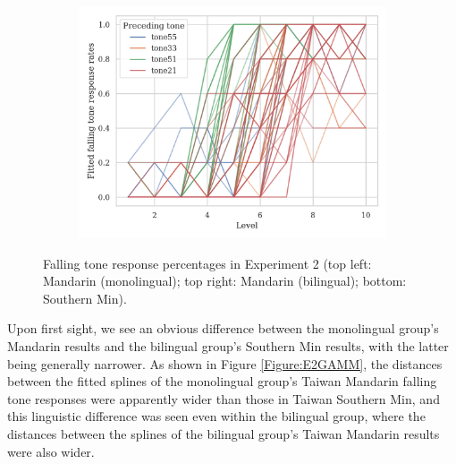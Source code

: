 \begin{figure}[hbt!]
\begin{subfigure}[b]{.45\textwidth}
\includegraphics[width=\textwidth]{figures/E2/Min_E2_raw.png}
\end{subfigure}
\caption{Falling tone response percentages in Experiment 2 (top left: Mandarin (monolingual); top right: Mandarin (bilingual); bottom: Southern Min).}
\label{Figure:E2Raw}
\end{figure}

Upon first sight, we see an obvious difference between the monolingual group's Mandarin results and the bilingual group's Southern Min results, with the latter being generally narrower. As shown in Figure \ref{Figure:E2GAMM}, the distances between the fitted splines of the monolingual group's Taiwan Mandarin falling tone responses were apparently wider than those in Taiwan Southern Min, and this linguistic difference was seen even within the bilingual group, where the distances between the splines of the bilingual group's Taiwan Mandarin results were also wider.

